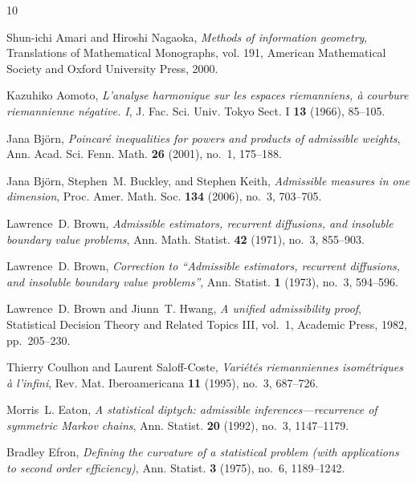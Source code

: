 \documentclass[11pt]{amsart}
\theoremstyle{plain}
\theoremstyle{definition}
\theoremstyle{remark}
\begin{document}
\clearpage
{\small
\begin{thebibliography}{10}

Shun-ichi Amari and Hiroshi Nagaoka, \emph{Methods of information geometry},
  Translations of Mathematical Monographs, vol. 191, American Mathematical
  Society and Oxford University Press, 2000.

Kazuhiko Aomoto, \emph{L'analyse harmonique sur les espaces riemanniens, \`a
  courbure riemannienne n\'egative. {I}}, J. Fac. Sci. Univ. Tokyo Sect. I
  \textbf{13} (1966), 85--105.

Jana Bj{\"o}rn, \emph{Poincar\'e inequalities for powers and products of
  admissible weights}, Ann. Acad. Sci. Fenn. Math. \textbf{26} (2001), no.~1,
  175--188.

Jana Bj{\"o}rn, Stephen~M. Buckley, and Stephen Keith, \emph{Admissible measures
  in one dimension}, Proc. Amer. Math. Soc. \textbf{134} (2006), no.~3,
  703--705.

Lawrence~D. Brown, \emph{Admissible estimators, recurrent diffusions, and
  insoluble boundary value problems}, Ann. Math. Statist. \textbf{42} (1971),
  no.~3, 855--903.

Lawrence~D. Brown, \emph{Correction to ``Admissible estimators, recurrent
  diffusions, and insoluble boundary value problems''}, Ann. Statist.
  \textbf{1} (1973), no.~3, 594--596.

Lawrence~D. Brown and Jiunn~T. Hwang, \emph{A unified admissibility proof},
  Statistical Decision Theory and Related Topics III, vol.~1, Academic Press,
  1982, pp.~205--230.

Thierry Coulhon and Laurent Saloff-Coste, \emph{Vari\'et\'es riemanniennes
  isom\'etriques \`a l'infini}, Rev. Mat. Iberoamericana \textbf{11} (1995),
  no.~3, 687--726.

Morris~L. Eaton, \emph{A statistical diptych: admissible
  inferences---recurrence of symmetric {M}arkov chains}, Ann. Statist.
  \textbf{20} (1992), no.~3, 1147--1179.

Bradley Efron, \emph{Defining the curvature of a statistical problem (with
  applications to second order efficiency)}, Ann. Statist. \textbf{3} (1975),
  no.~6, 1189--1242.


\end{thebibliography}}
\end{document}

